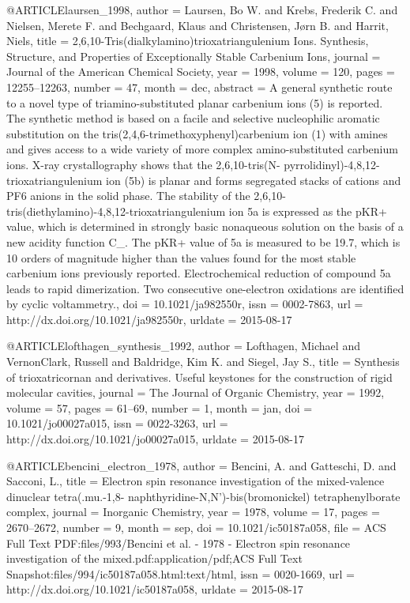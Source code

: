 @ARTICLE{laursen_1998,
  author = {Laursen, Bo W. and Krebs, Frederik C. and Nielsen, Merete F. and
	Bechgaard, Klaus and Christensen, Jørn B. and Harrit, Niels},
  title = {2,6,10-{Tris}(dialkylamino)trioxatriangulenium {Ions}. {Synthesis},
	{Structure}, and {Properties} of {Exceptionally} {Stable} {Carbenium}
	{Ions}},
  journal = {Journal of the American Chemical Society},
  year = {1998},
  volume = {120},
  pages = {12255--12263},
  number = {47},
  month = dec,
  abstract = {A general synthetic route to a novel type of triamino-substituted
	planar carbenium ions (5) is reported. The synthetic method is based
	on a facile and selective nucleophilic aromatic substitution on the
	tris(2,4,6-trimethoxyphenyl)carbenium ion (1) with amines and gives
	access to a wide variety of more complex amino-substituted carbenium
	ions. X-ray crystallography shows that the 2,6,10-tris(N- pyrrolidinyl)-4,8,12-trioxatriangulenium
	ion (5b) is planar and forms segregated stacks of cations and PF6
	anions in the solid phase. The stability of the 2,6,10-tris(diethylamino)-4,8,12-trioxatriangulenium
	ion 5a is expressed as the pKR+ value, which is determined in strongly
	basic nonaqueous solution on the basis of a new acidity function
	C\_. The pKR+ value of 5a is measured to be 19.7, which is 10 orders
	of magnitude higher than the values found for the most stable carbenium
	ions previously reported. Electrochemical reduction of compound 5a
	leads to rapid dimerization. Two consecutive one-electron oxidations
	are identified by cyclic voltammetry.},
  doi = {10.1021/ja982550r},
  issn = {0002-7863},
  url = {http://dx.doi.org/10.1021/ja982550r},
  urldate = {2015-08-17}
}

@ARTICLE{lofthagen_synthesis_1992,
  author = {Lofthagen, Michael and VernonClark, Russell and Baldridge, Kim K.
	and Siegel, Jay S.},
  title = {Synthesis of trioxatricornan and derivatives. {Useful} keystones
	for the construction of rigid molecular cavities},
  journal = {The Journal of Organic Chemistry},
  year = {1992},
  volume = {57},
  pages = {61--69},
  number = {1},
  month = jan,
  doi = {10.1021/jo00027a015},
  issn = {0022-3263},
  url = {http://dx.doi.org/10.1021/jo00027a015},
  urldate = {2015-08-17}
}

@ARTICLE{bencini_electron_1978,
  author = {Bencini, A. and Gatteschi, D. and Sacconi, L.},
  title = {Electron spin resonance investigation of the mixed-valence dinuclear
	tetra(.mu.-1,8- naphthyridine-{N},{N}')-bis(bromonickel) tetraphenylborate
	complex},
  journal = {Inorganic Chemistry},
  year = {1978},
  volume = {17},
  pages = {2670--2672},
  number = {9},
  month = sep,
  doi = {10.1021/ic50187a058},
  file = {ACS Full Text PDF:files/993/Bencini et al. - 1978 - Electron spin resonance investigation of  the mixed.pdf:application/pdf;ACS Full Text Snapshot:files/994/ic50187a058.html:text/html},
  issn = {0020-1669},
  url = {http://dx.doi.org/10.1021/ic50187a058},
  urldate = {2015-08-17}
}

